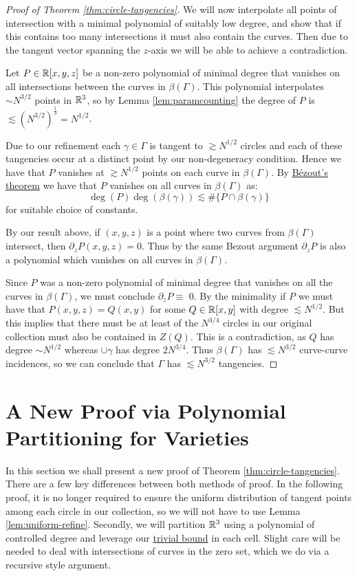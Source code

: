 \begin{proof}[Proof of Theorem \ref{thm:circle-tangencies}]
    We will now interpolate all points of intersection with a minimal polynomial of suitably low degree, and show that if this contains too many intersections it must also contain the curves. 
    Then due to the tangent vector spanning the $z$-axis we will be able to achieve a contradiction.

    Let $P \in \mathbb R[x,y,z]$ be a non-zero polynomial of minimal degree that vanishes on all intersections between the curves in $\beta (\Gamma)$. 
    This polynomial interpolates $\sim N^{3/2}$ points in $\mathbb R^3$, so by Lemma \ref{lem:paramcounting}
    the degree of $P$ is $\lesssim \left(N^{3/2}\right)^{\frac{1}{3}} =  N^{1/2}$. 

    Due to our refinement each $\gamma \in \Gamma$ is 
    tangent to $\gtrsim N^{1/2}$ circles and each of these tangencies occur at a distinct point by our non-degeneracy condition.   
    Hence we have that $P$ vanishes at $\gtrsim N^{1/2}$ points on each curve in $\beta (\Gamma)$.
    By \hyperref[lem:Bezout]{Bézout's theorem} we have that $P$ vanishes on all curves in $\beta(\Gamma)$ as:
    \[
    \deg (P) \deg (\beta(\gamma))  \lesssim \# \{ P \cap \beta(\gamma)\}  
    \]
    for suitable choice of constants. 

    By our result above, if $(x,y,z)$ is a point where two curves from $\beta (\Gamma)$ intersect, then $\partial_z P (x,y,z)  =0 $. 
    Thus by the same Bezout argument $\partial_z P$ is also a polynomial which vanishes on all curves in $\beta(\Gamma)$. 

    Since $P$ was a non-zero polynomial of minimal degree that vanishes on all the curves in $\beta (\Gamma)$, we must conclude 
    $\partial_z P \equiv$ 0. By the minimality if $P$ we must have that $P(x,y,z) = Q(x,y)$ for some $Q \in \mathbb R[x,y]$ with degree $\lesssim N^{1/2}$. 
    But this implies that there must be at least of the $N^{3/4}$ circles in our original collection must also be contained in $Z(Q)$.
    This is a contradiction, as $Q$ has degree $\sim N^{1/2}$ whereas $\cup \gamma$ has degree $2N^{3/4}$.
    Thus $\beta(\Gamma)$ has $\lesssim N^{3/2}$ curve-curve incidences, so we can conclude that $\Gamma$ has $\lesssim N^{3/2}$ tangencies.
\end{proof}

\section[New Proof via Polynomial Partitioning]{A New Proof via Polynomial Partitioning for Varieties}
In this section we shall present a new proof of Theorem \ref{thm:circle-tangencies}. 
There are a few key differences between both methods of proof. In the following proof, 
it is no longer required to ensure the uniform distribution of tangent points among each circle in our collection, so we will not
have to use Lemma \ref{lem:uniform-refine}.
Secondly, we will partition $\mathbb R^3$ using a polynomial of controlled degree and leverage our \hyperref[thm:trivial-circle-bound]{trivial bound} in each cell.
Slight care will be needed to deal with intersections of curves in the zero set, which we do via a recursive style argument.

